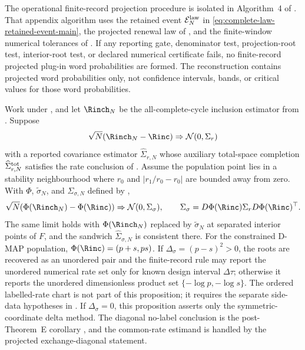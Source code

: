 \begin{remark}\label{rem:finite-record-complete-law-implementation-main}
The operational finite-record projection procedure is isolated in Algorithm~4
of .  That appendix
algorithm uses the retained event \(\mathcal E_N^{\rm law}\) in
\eqref{eq:complete-law-retained-event-main}, the projected renewal law of
, and the
finite-window numerical tolerances of
.  If any reporting gate,
denominator test, projection-root test, interior-root test, or declared
numerical certificate fails, no finite-record projected plug-in word
probabilities are formed.  The reconstruction contains projected word
probabilities only, not confidence intervals, bands, or critical values for
those word probabilities.
\end{remark}

\begin{proposition}\label{prop:finite-record-symmetric-coordinate-inverse-delta-main}
Work under , and let
\(\Rinch_N\) be the all-complete-cycle inclusion estimator from
.  Suppose
\[
\sqrt N(\Rinch_N-\Rinc)\Rightarrow \mathcal N(0,\Sigma_r)
\]
with a reported covariance estimator \(\widehat\Sigma_{r,N}\) whose auxiliary
total-space completion \(\widehat\Sigma_{r,N}^{\rm tot}\) satisfies
the rate conclusion of .  Assume the
population point lies in a stability neighbourhood where \(r_0\) and
\(|r_1/r_0-r_0|\) are bounded away from zero.  With \(\Phi\),
\(\widetilde\sigma_N\), and \(\widehat\Sigma_{\sigma,N}\) defined by
,
\[
\sqrt N(\Phi(\Rinch_N)-\Phi(\Rinc))
\Rightarrow \mathcal N(0,\Sigma_{\sigma}),
\qquad
\Sigma_{\sigma}=D\Phi(\Rinc)\Sigma_rD\Phi(\Rinc)^\top .
\]
The same limit holds with \(\Phi(\Rinch_N)\) replaced by
\(\widetilde\sigma_N\) at separated interior points of \(F\), and the sandwich
\(\widehat\Sigma_{\sigma,N}\) is consistent there.  For the constrained D-MAP
population, \(\Phi(\Rinc)=(p+s,ps)\).  If \(\Delta_\sigma=(p-s)^2>0\), the roots are
recovered as an unordered pair and the finite-record rule may report the
unordered numerical rate set only for known design interval \(\Delta\tau\);
otherwise it reports the unordered dimensionless product set
\(\{-\log p,-\log s\}\).  The ordered labelled-rate chart is not part of this
proposition; it requires the separate side-data hypotheses in
.
If \(\Delta_\sigma=0\), this proposition asserts only the symmetric-coordinate
delta method.  The diagonal no-label conclusion is the post-Theorem~E
corollary , and the
common-rate estimand is handled by the projected exchange-diagonal statement.
\end{proposition}

